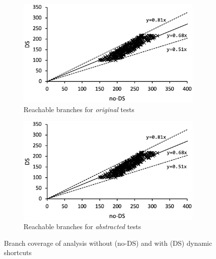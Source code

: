 \begin{figure}[t]
  \centering
  \begin{subfigure}[t]{0.48\textwidth}
    \includegraphics[width=\linewidth]{img/conc-precision}
    \vspace*{-1.5em}
    \caption{Reachable branches for  \textit{original} tests}
    \label{fig:precision-fail}
  \end{subfigure}
  \begin{subfigure}[t]{0.48\textwidth}
    \includegraphics[width=\linewidth]{img/abs-precision}
    \vspace*{-1.5em}
    \caption{Reachable branches for  \textit{abstracted} tests}
    \label{fig:precision-branch}
  \end{subfigure}
  \vspace*{-1em}
  \caption{Branch coverage of analysis without (no-DS) and with (DS) dynamic shortcuts}
  \label{fig:precision}
  \vspace*{-1.5em}
\end{figure}



